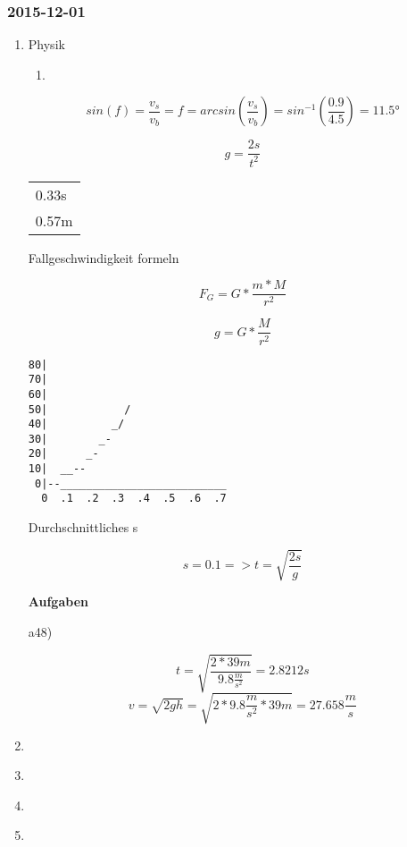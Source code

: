 \documentclass[11pt]{article}
\begin{document}
\subsubsection{2015-12-01}
\label{sec-1-2-10}
\begin{enumerate}
\item Physik
\label{sec-1-2-10-1}
\begin{enumerate}
\item 
\end{enumerate}
\begin{equation}
sin(f) = \frac{v_s}{v_b} = f = arcsin(\frac{v_s}{v_b}) = sin^{-1}(\frac{0.9}{4.5}) = 11.5°
\end{equation}


\begin{equation}
g = \frac{2s}{t^2}
\end{equation}


\begin{center}
\begin{tabular}{l}
0.33s\\
0.57m\\
\end{tabular}
\end{center}


Fallgeschwindigkeit formeln


\begin{equation}
F_G = G * \frac{m*M}{r^2}
\end{equation}

\begin{equation}
g = G*\frac{M}{r^2}
\end{equation}


\begin{verbatim}
80|
70|
60|
50|            /
40|          _/
30|        _-
20|      _-
10|  __--
 0|--__________________________
  0  .1  .2  .3  .4  .5  .6  .7
\end{verbatim}


Durchschnittliches s


\begin{equation}
s=0.1 => t = \sqrt{\frac{2s}{g}}
\end{equation}



\textbf{Aufgaben}

a48)


\begin{equation}
t = \sqrt{\frac{2*39m}{9.8\frac{m}{s^2}}} = 2.8212s
\end{equation}
\begin{equation}
v = \sqrt{2gh} = \sqrt{2 * 9.8\frac{m}{s^2} * 39m} = 27.658\frac{m}{s}
\end{equation}
\item 
\label{sec-1-2-10-2}
\item 
\label{sec-1-2-10-3}
\item 
\label{sec-1-2-10-4}
\item 
\label{sec-1-2-10-5}





\end{enumerate}
\end{document}

